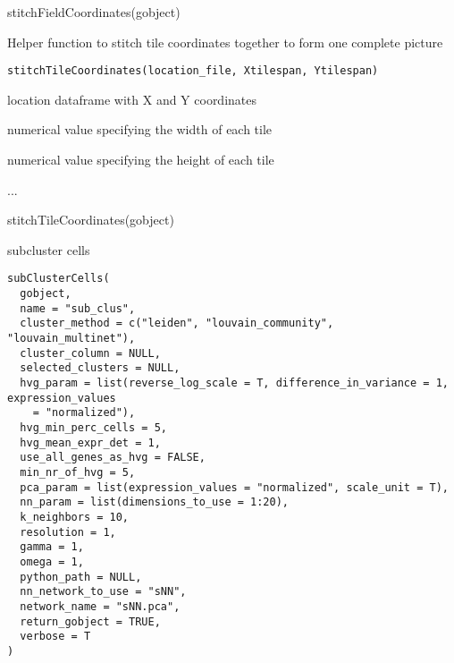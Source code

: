 \documentclass[a4paper]{book}
\begin{document}
%
\begin{Examples}
\begin{ExampleCode}
    stitchFieldCoordinates(gobject)
\end{ExampleCode}
\end{Examples}
%
\begin{Description}\relax
Helper function to stitch tile coordinates together to form one complete picture
\end{Description}
%
\begin{Usage}
\begin{verbatim}
stitchTileCoordinates(location_file, Xtilespan, Ytilespan)
\end{verbatim}
\end{Usage}
%
\begin{Arguments}
\begin{ldescription}
\item[\code{location\_file}] location dataframe with X and Y coordinates

\item[\code{Xtilespan}] numerical value specifying the width of each tile

\item[\code{Ytilespan}] numerical value specifying the height of each tile
\end{ldescription}
\end{Arguments}
%
\begin{Details}\relax
...
\end{Details}
%
\begin{Examples}
\begin{ExampleCode}
    stitchTileCoordinates(gobject)
\end{ExampleCode}
\end{Examples}
%
\begin{Description}\relax
subcluster cells
\end{Description}
%
\begin{Usage}
\begin{verbatim}
subClusterCells(
  gobject,
  name = "sub_clus",
  cluster_method = c("leiden", "louvain_community", "louvain_multinet"),
  cluster_column = NULL,
  selected_clusters = NULL,
  hvg_param = list(reverse_log_scale = T, difference_in_variance = 1, expression_values
    = "normalized"),
  hvg_min_perc_cells = 5,
  hvg_mean_expr_det = 1,
  use_all_genes_as_hvg = FALSE,
  min_nr_of_hvg = 5,
  pca_param = list(expression_values = "normalized", scale_unit = T),
  nn_param = list(dimensions_to_use = 1:20),
  k_neighbors = 10,
  resolution = 1,
  gamma = 1,
  omega = 1,
  python_path = NULL,
  nn_network_to_use = "sNN",
  network_name = "sNN.pca",
  return_gobject = TRUE,
  verbose = T
)
\end{verbatim}
\end{Usage}
\end{document}
